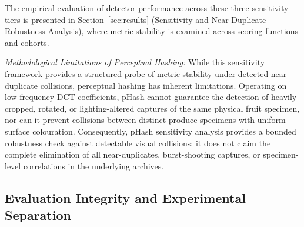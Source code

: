 The empirical evaluation of detector performance across these three sensitivity tiers is presented in Section~\ref{sec:results} (Sensitivity and Near-Duplicate Robustness Analysis), where metric stability is examined across scoring functions and cohorts.

\noindent \textit{Methodological Limitations of Perceptual Hashing:} While this sensitivity framework provides a structured probe of metric stability under detected near-duplicate collisions, perceptual hashing has inherent limitations. Operating on low-frequency DCT coefficients, pHash cannot guarantee the detection of heavily cropped, rotated, or lighting-altered captures of the same physical fruit specimen, nor can it prevent collisions between distinct produce specimens with uniform surface colouration. Consequently, pHash sensitivity analysis provides a bounded robustness check against detectable visual collisions; it does not claim the complete elimination of all near-duplicates, burst-shooting captures, or specimen-level correlations in the underlying archives.

\subsection{Evaluation Integrity and Experimental Separation}
\label{sec:evaluation_integrity}

